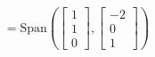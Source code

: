 \documentclass[preview]{standalone}
\begin{document}
\begin{align*}
= \text{Span}\left(\begin{bmatrix} 1 \\ 1 \\ 0 \end{bmatrix}, \begin{bmatrix} -2 \\ 0 \\ 1 \end{bmatrix}\right)
\end{align*}
\end{document}
